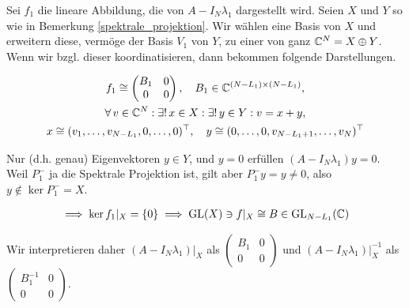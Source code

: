 \begin{remark} \label{semi_inverse}

    Sei $f_1$ die lineare Abbildung, die von $A - I_N \lambda_1$ dargestellt wird.
    Seien $X$ und $Y$ so wie in Bemerkung \ref{spektrale_projektion}.
    Wir wählen eine Basis von $X$ und erweitern diese, vermöge der Basis $V_1$ von $Y$, zu einer von ganz $\mathbb{C}^N = X \oplus Y$.
    Wenn wir bzgl. dieser koordinatisieren, dann bekommen folgende Darstellungen.

    \begin{gather*}
        f_1
        \cong
        \begin{pmatrix}
            B_1 & 0 \\
            0   & 0
        \end{pmatrix},
        \quad
        B_1 \in \mathbb{C}^{(N - L_1) \times (N - L_1)}, \\
        \forall \, v \in \mathbb{C}^N:
            \exists! \, x \in X:
            \exists! \, y \in Y:
                v = x + y, \\
        x
        \cong
        (
            v_1, \dots, v_{N - L_1},
            0, \dots, 0
        )^\top,
        \quad
        y
        \cong
        (
            0, \dots, 0,
            v_{N - L_1 + 1}, \dots, v_N
        )^\top
    \end{gather*}

    Nur (d.h. genau) Eigenvektoren $y \in Y$, und $y = 0$ erfüllen $(A - I_N \lambda_1) y = 0$.
    Weil $P_1^-$ ja die Spektrale Projektion ist, gilt aber $P_1^- y = y \neq 0$, also $y \not \in \ker P_1^- = X$.

    \begin{align*}
        \implies
        \ker f_1 |_X = {\left \{ 0 \right \}}
        \implies
        \operatorname{GL}(X) \ni f |_X \cong B \in \operatorname{GL}_{N - L_1}(\mathbb{C})
    \end{align*}

    Wir interpretieren daher $(A - I_N \lambda_1) |_X$ als $\begin{pmatrix} B_1 & 0 \\ 0 & 0 \end{pmatrix}$ und $(A - I_N \lambda_1) |_X^{-1}$ als $\begin{pmatrix} B_1^{-1} & 0 \\ 0 & 0 \end{pmatrix}$.

\end{remark}